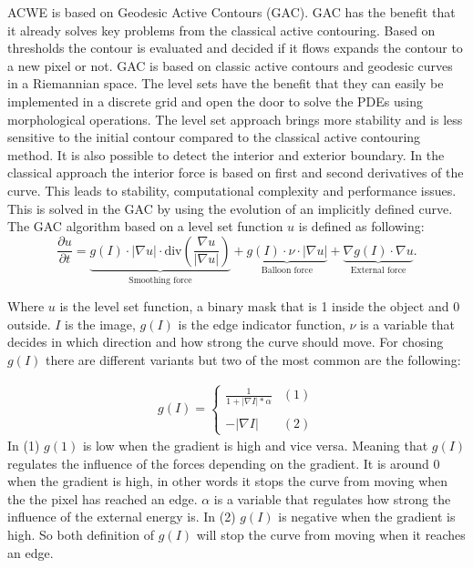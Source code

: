 ACWE is based on Geodesic Active Contours (GAC). GAC has the benefit that it already solves key problems from the classical active contouring. Based on thresholds the contour is evaluated and decided if it flows expands the contour to a new pixel or not. GAC is based on classic active contours and geodesic curves in a Riemannian space. The level sets have the benefit that they can easily be implemented in a discrete grid and open the door to solve the PDEs using morphological operations. The level set approach brings more stability and is less sensitive to the initial contour compared to the classical active contouring method. It is also possible to detect the interior and exterior boundary. In the classical approach the interior force is based on first and second derivatives of the curve. This leads to stability, computational complexity and performance issues. This is solved in the GAC by using the evolution of an implicitly defined curve. The GAC algorithm based on a level set function $u$ is defined as following:
\begin{equation}
    \frac{\partial u}{\partial t} = 
    \underbrace{g(I) \cdot |\nabla u| \cdot \text{div} \left(\frac{\nabla u}{|\nabla u|}\right)}_{\text{Smoothing force}} 
    + \underbrace{g(I) \cdot \nu \cdot |\nabla u|}_{\text{Balloon force}} 
    + \underbrace{\nabla g(I) \cdot \nabla u}_{\text{External force}}.
    \label{deform}
    \end{equation}
    
Where $u$ is the level set function, a binary mask that is 1 inside the object and 0 outside. $I$ is the image, $g(I)$ is the edge indicator function, $\nu$ is a variable that decides in which direction and how strong the curve should move. 
For chosing $g(I)$ there are different variants but two of the most common are the following: 

\begin{align}
    g(I) = \begin{cases}
     \frac{1}{1 + |\nabla I|*\alpha} &(1)\\
     \\
     -|\nabla I| &(2)
    \end{cases}
\end{align}
In (1) $g(1)$ is low when the gradient is high and vice versa. Meaning that $g(I)$ regulates the influence of the forces depending on the gradient. It is around 0 when the gradient is high, in other words it stops the curve from moving when the the pixel has reached an edge. $\alpha$ is a variable that regulates how strong the influence of the external energy is.  In (2) $g(I)$ is negative when the gradient is high. So both definition of $g(I)$ will stop the curve from moving when it reaches an edge.

